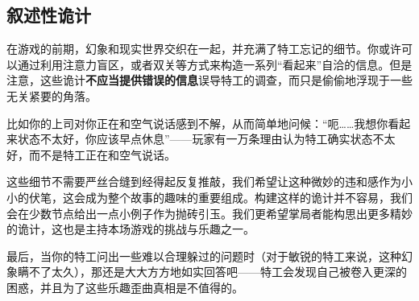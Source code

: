 \subsection{叙述性诡计}

在游戏的前期，幻象和现实世界交织在一起，并充满了特工忘记的细节。你或许可以通过利用注意力盲区，或者双关等方式来构造一系列“看起来”自洽的信息。但是注意，这些诡计\textbf{不应当提供错误的信息}误导特工的调查，而只是偷偷地浮现于一些无关紧要的角落。

比如你的上司对你正在和空气说话感到不解，从而简单地问候：“呃……我想你看起来状态不太好，你应该早点休息”——玩家有一万条理由认为特工确实状态不太好，而不是特工正在和空气说话。

这些细节不需要严丝合缝到经得起反复推敲，我们希望让这种微妙的违和感作为小小的伏笔，这会成为整个故事的趣味的重要组成。构建这样的诡计并不容易，我们会在少数节点给出一点小例子作为抛砖引玉。我们更希望掌局者能构思出更多精妙的诡计，这也是主持本场游戏的挑战与乐趣之一。

最后，当你的特工问出一些难以合理躲过的问题时（对于敏锐的特工来说，这种幻象瞒不了太久），那还是大大方方地如实回答吧——特工会发现自己被卷入更深的困惑，并且为了这些乐趣歪曲真相是不值得的。